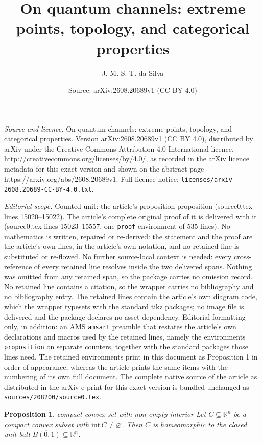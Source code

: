\documentclass[10pt,a4paper]{amsart}
\title{On quantum channels: extreme points, topology, and categorical properties}
\author{J. M. S. T. da Silva}
\date{Source: arXiv:2608.20689v1 (CC BY 4.0)}
\newtheorem{proposition}{Proposition}
\newcommand{\interior}[1]{\mathrm{int} \, #1}
\newcommand{\realNumbers}{\mathbb{R}}
\begin{document}
\maketitle

\noindent\emph{Source and licence.} On quantum channels: extreme points, topology, and categorical properties. Version arXiv:2608.20689v1 (CC BY 4.0), distributed by arXiv under the Creative Commons Attribution 4.0 International licence, http://creativecommons.org/licenses/by/4.0/, as recorded in the arXiv licence metadata for this exact version and shown on the abstract page https://arxiv.org/abs/2608.20689v1. Full licence notice: \texttt{licenses/arxiv-2608.20689-CC-BY-4.0.txt}.\par\smallskip

\noindent\textit{Editorial scope.} Counted unit: the article's proposition proposition (source0.tex lines 15020--15022). The article's complete original proof of it is delivered with it (source0.tex lines 15023--15557, one \texttt{proof} environment of 535 lines). No mathematics is written, repaired or re-derived: the statement and the proof are the article's own lines, in the article's own notation, and no retained line is substituted or re-flowed.  No further source-local context is needed: every cross-reference of every retained line resolves inside the two delivered spans.  Nothing was omitted from any retained span, so the package carries no omission record.  No retained line contains a citation, so the wrapper carries no bibliography and no bibliography entry.  The retained lines contain the article's own diagram code, which the wrapper typesets with the standard tikz packages; no image file is delivered and the package declares no asset dependency.  Editorial formatting only, in addition: an AMS \texttt{amsart} preamble that restates the article's own declarations and macros used by the retained lines, namely the environments \texttt{proposition} on separate counters, together with the standard packages those lines need.  The retained environments print in this document as Proposition 1 in order of appearance, whereas the article prints the same items with the numbering of its own full document.  The complete native source of the article as distributed in the arXiv e-print for this exact version is bundled unchanged as \texttt{sources/208200/source0.tex}.
\begin{proposition}{}{compact convex set with non empty interior}
	Let $C \subseteq \realNumbers^n$ be a compact convex subset with $\interior{C} \neq \varnothing$. Then $C$ is homeomorphic to the closed unit ball $\overline{B(0,1)} \subseteq \realNumbers^n$.
\end{proposition}
\end{document}
